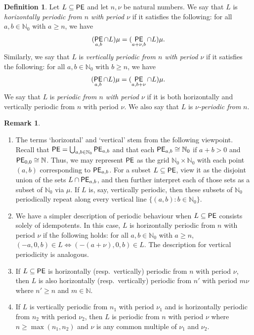 \documentclass[reqno]{amsart}
\theoremstyle{plain}
\theoremstyle{definition}
\newtheorem{defn}[lem]{Definition}
\newtheorem{rmk}[lem]{Remark}
\DeclareMathOperator{\PE}{\textup{\textsf{PE}}}
\newenvironment{rmkenumerate}{\begin{enumerate}[align=left, leftmargin = 0mm, listparindent=0mm, labelwidth=2mm, itemindent=!, itemsep=1.5mm, labelsep=3mm, label=\textup{(\arabic*)}]
}{\end{enumerate}}
\numberwithin{equation}{section}
\begin{document}
\begin{defn}
\label{defn:PeriodicSets}
Let $L\subseteq \PE$ and let $n,\nu$ be natural numbers. We say that $L$ is \emph{horizontally periodic from $n$ with period $\nu$} if it satisfies the following: for all $a,b\in\mathbb{N}_0$ with $a\geq n$, we have 
\[
(\PE_{a,b}\cap L)\mu = (\PE_{a+\nu, b}\cap L)\mu. 
\]
Similarly, we say that $L$ is \emph{vertically periodic from $n$ with period $\nu$} if it satisfies the following: for all $a,b\in\mathbb{N}_0$ with $b\geq n$, we have 
\[
(\PE_{a,b}\cap L)\mu = (\PE_{a,b+\nu}\cap L)\mu.
\]
We say that $L$ is \emph{periodic from $n$ with period $\nu$} if it is both horizontally and vertically periodic from $n$ with period $\nu$. We also say that $L$ is \emph{$\nu$-periodic from} $n$.
\end{defn}
\begin{rmk}
\label{rmk:PeriodicSets}
\begin{rmkenumerate}
    \item The terms `horizontal' and `vertical' stem from the following viewpoint.
Recall that $\PE = \bigcup_{a,b\in\mathbb{N}_0}\PE_{a,b}$ and that each $\PE_{a,b}\cong\mathbb{N}_0$ if $a+b>0$ and $\PE_{0,0}\cong\mathbb{N}$. Thus, we may represent $\PE$ as the grid $\mathbb{N}_0\times\mathbb{N}_0$
 with each point $(a,b)$ corresponding to $\PE_{a,b}$. 
For a subset $L\subseteq \PE$, view it as the disjoint union of the sets $L\cap \PE_{a,b}$, and then further interpret each of those sets as a subset of $\mathbb{N}_0$ via $\mu$.
If $L$ is, say, vertically periodic, then these subsets of $\mathbb{N}_0$ periodically repeat along every vertical line $\{(a,b) : b\in\mathbb{N}_0\}$. 
    \item We have a simpler description of periodic behaviour when $L\subseteq \PE$ consists solely of idempotents. In this case, $L$ is horizontally periodic from $n$ with period $\nu$ if the following holds: for all $a,b\in\mathbb{N}_0$ with $a\geq n$, $(-a, 0, b)\in L \Leftrightarrow (-(a+\nu), 0, b)\in L$. The description for vertical periodicity is analogous.
   
    \item If $L\subseteq\PE$ is horizontally (resp.\ vertically) periodic from $n$ with period $\nu$, then $L$ is also horizontally (resp.\ vertically) periodic from $n'$ with period $m\nu$ where $n'\geq n$ and $m\in\mathbb{N}$.
    \item If $L$ is vertically periodic from $n_1$ with period $\nu_1$ and is horizontally periodic from $n_2$ with period $\nu_2$, then $L$ is periodic from $n$ with period $\nu$ where $n\geq \max(n_1, n_2)$ and $\nu$ is any common multiple of $\nu_1$ and $\nu_2$.
\end{rmkenumerate}
\end{rmk}
\end{document}
